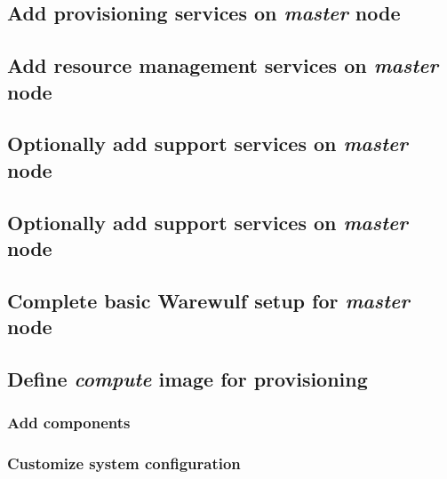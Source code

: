 \documentclass[letterpaper]{article}
\begin{document}
\subsection{Add provisioning services on {\em master} node} \label{sec:add_provisioning}




\vspace*{0.15cm}
\subsection{Add resource management services on {\em master} node} \label{sec:add_rm}


\subsection{Optionally add \InfiniBand{} support services on {\em master} node} \label{sec:add_ofed}


\subsection{Optionally add \OmniPath{} support services on {\em master} node} \label{sec:add_opa}


\vspace*{-0.15cm}
\subsection{Complete basic Warewulf setup for {\em master} node} \label{sec:setup_ww}



\subsection{Define {\em compute} image for provisioning}


\subsubsection{Add \OHPC{} components} \label{sec:add_components}



\vspace*{.2cm}
\subsubsection{Customize system configuration} \label{sec:master_customization}

\end{document}
